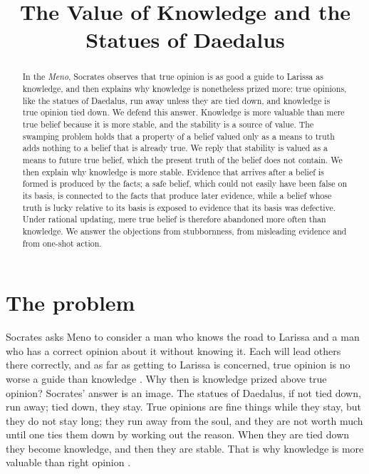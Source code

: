 \documentclass{situationist-preprint}
\title{The Value of Knowledge and the Statues of Daedalus}
\begin{document}
\maketitle

\begin{abstract}
In the \emph{Meno}, Socrates observes that true opinion is as good a guide to Larissa as knowledge, and then explains why knowledge is nonetheless prized more: true opinions, like the statues of Daedalus, run away unless they are tied down, and knowledge is true opinion tied down. We defend this answer. Knowledge is more valuable than mere true belief because it is more stable, and the stability is a source of value. The swamping problem holds that a property of a belief valued only as a means to truth adds nothing to a belief that is already true. We reply that stability is valued as a means to future true belief, which the present truth of the belief does not contain. We then explain why knowledge is more stable. Evidence that arrives after a belief is formed is produced by the facts; a safe belief, which could not easily have been false on its basis, is connected to the facts that produce later evidence, while a belief whose truth is lucky relative to its basis is exposed to evidence that its basis was defective. Under rational updating, mere true belief is therefore abandoned more often than knowledge. We answer the objections from stubbornness, from misleading evidence and from one-shot action.
\end{abstract}

\section{The problem}

Socrates asks Meno to consider a man who knows the road to Larissa and a man who has a correct opinion about it without knowing it. Each will lead others there correctly, and as far as getting to Larissa is concerned, true opinion is no worse a guide than knowledge \citep[97a--c]{PlatoMeno}. Why then is knowledge prized above true opinion? Socrates' answer is an image. The statues of Daedalus, if not tied down, run away; tied down, they stay. True opinions are fine things while they stay, but they do not stay long; they run away from the soul, and they are not worth much until one ties them down by working out the reason. When they are tied down they become knowledge, and then they are stable. That is why knowledge is more valuable than right opinion \citep[97d--98a]{PlatoMeno}.
\end{document}
